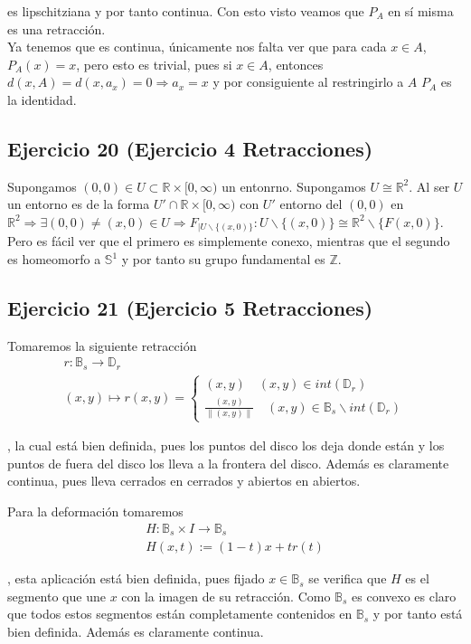 \documentclass{article}
\begin{document}
es lipschitziana y por tanto continua. Con esto visto veamos que $P_A$ en sí misma es una retracción.\\

Ya tenemos que es continua, únicamente nos falta ver que para cada $x\in A$, $P_A(x)=x$, pero esto es trivial, pues si $x\in A$, entonces $d(x,A)=d(x,a_x)=0\Rightarrow a_x=x$ y por consiguiente al restringirlo a $A$ $P_A$ es la identidad.

\subsection{Ejercicio 20 (Ejercicio 4 Retracciones)}
Supongamos $(0,0)\in U\subset\mathbb{R}\times [0,\infty)$ un entonrno. Supongamos $U\cong \mathbb{R}^2$. Al ser $U$ un entorno es de la forma $U'\cap \mathbb{R}\times [0,\infty)$ con $U'$ entorno del $(0,0)$ en $\mathbb{R}^2 \Rightarrow \exists (0,0)\neq (x,0)\in U\Rightarrow F_{|U\backslash\{(x,0)\}}:U\backslash\{(x,0)\}\cong \mathbb{R}^2\backslash\{F(x,0)\}$. Pero es fácil ver que el primero es simplemente conexo, mientras que el segundo es homeomorfo a $\mathbb{S}^1$ y por tanto su grupo fundamental es $\mathbb{Z}$.

\subsection{Ejercicio 21 (Ejercicio 5 Retracciones)}
Tomaremos la siguiente retracción
\begin{gather*}
r:\mathbb{B}_s\rightarrow \mathbb{D}_r\\
(x,y)\mapsto r(x,y)=\left\lbrace\begin{array}{c}
(x,y)\quad (x,y)\in int(\mathbb{D}_r)\\
\frac{(x,y)}{\|(x,y)\|} \quad (x,y)\in \mathbb{B}_s\backslash int(\mathbb{D}_r)
\end{array}\right.
\end{gather*}

, la cual está bien definida, pues los puntos del disco los deja donde están y los puntos de fuera del disco los lleva a la frontera del disco. Además es claramente continua, pues lleva cerrados en cerrados y abiertos en abiertos.

Para la deformación tomaremos
\begin{gather*}
H:\mathbb{B}_s\times I\rightarrow \mathbb{B}_s\\
H(x,t):=(1-t)x+tr(t)
\end{gather*}

, esta aplicación está bien definida, pues fijado $x\in \mathbb{B}_s$ se verifica que $H$ es el segmento que une $x$ con la imagen de su retracción. Como $\mathbb{B}_s$ es convexo es claro que todos estos segmentos están completamente contenidos en $\mathbb{B}_s$ y por tanto está bien definida. Además es claramente continua. 
\end{document}
